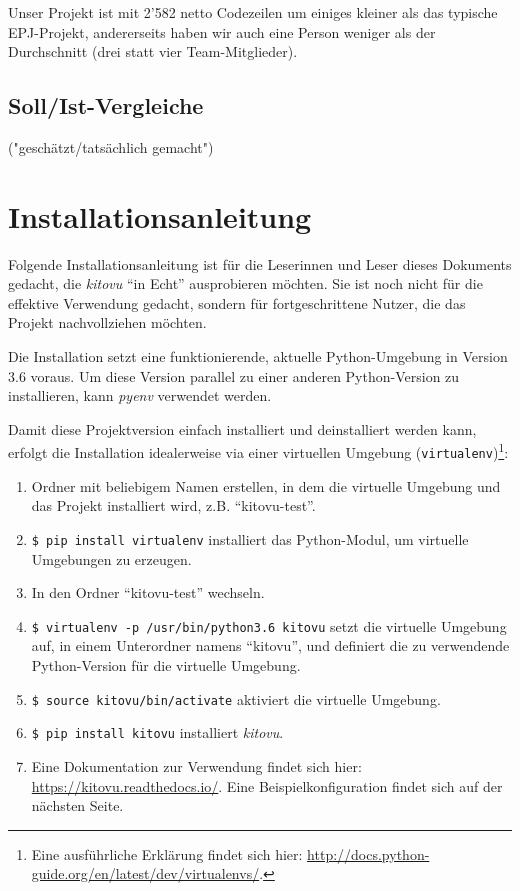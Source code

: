 \documentclass[a4paper]{article}
\let\oldsection\section
\renewcommand\section{\clearpage\oldsection}
\begin{document}
Unser Projekt ist mit 2'582 netto Codezeilen um einiges kleiner als das typische EPJ-Projekt, andererseits haben wir auch eine Person weniger als der Durchschnitt (drei statt vier Team-Mitglieder).

\subsection{Soll/Ist-Vergleiche}

 ("geschätzt/tatsächlich gemacht")


\section{Installationsanleitung}

Folgende Installationsanleitung ist für die Leserinnen und Leser dieses Dokuments gedacht, die \emph{kitovu} ``in Echt'' ausprobieren möchten. Sie ist noch nicht für die effektive Verwendung gedacht, sondern für fortgeschrittene Nutzer, die das Projekt nachvollziehen möchten.

Die Installation setzt eine funktionierende, aktuelle Python-Umgebung in Version 3.6 voraus. Um diese Version parallel zu einer anderen Python-Version zu installieren, kann \emph{pyenv} verwendet werden.

Damit diese Projektversion einfach installiert und deinstalliert werden kann, erfolgt die Installation idealerweise via einer virtuellen Umgebung (\verb|virtualenv|)\footnote{Eine ausführliche Erklärung findet sich hier: \url{http://docs.python-guide.org/en/latest/dev/virtualenvs/}.}:

\begin{enumerate}
	\item Ordner mit beliebigem Namen erstellen, in dem die virtuelle Umgebung und das Projekt installiert wird, z.B. ``kitovu-test''.
	\item \verb|$ pip install virtualenv| \newline
	installiert das Python-Modul, um virtuelle Umgebungen zu erzeugen.
	\item In den Ordner ``kitovu-test'' wechseln.
	\item \verb|$ virtualenv -p /usr/bin/python3.6 kitovu| \newline
	setzt die virtuelle Umgebung auf, in einem Unterordner namens ``kitovu'', und definiert die zu verwendende Python-Version für die virtuelle Umgebung.
	\item \verb|$ source kitovu/bin/activate| \newline
	aktiviert die virtuelle Umgebung.
	\item \verb|$ pip install kitovu| \newline 
	installiert \emph{kitovu}.
	\item Eine Dokumentation zur Verwendung findet sich hier: \url{https://kitovu.readthedocs.io/}. Eine Beispielkonfiguration findet sich auf der nächsten Seite.
\end{enumerate}
\end{document}

